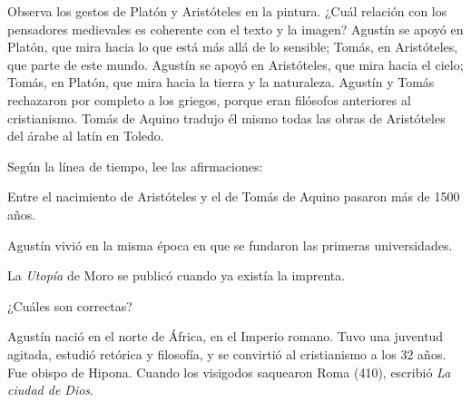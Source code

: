 \documentclass[carta,doscolumnas,compacta]{../plantilla/evaluacion}
\begin{document}
\begin{preguntas}
\begin{pregunta}[A]
Observa los gestos de Platón y Aristóteles en la pintura. ¿Cuál relación con los pensadores
medievales es coherente con el texto y la imagen?
\opcioneslargas
  {Agustín se apoyó en Platón, que mira hacia lo que está más allá de lo sensible; Tomás, en Aristóteles, que parte de este mundo.}
  {Agustín se apoyó en Aristóteles, que mira hacia el cielo; Tomás, en Platón, que mira hacia la tierra y la naturaleza.}
  {Agustín y Tomás rechazaron por completo a los griegos, porque eran filósofos anteriores al cristianismo.}
  {Tomás de Aquino tradujo él mismo todas las obras de Aristóteles del árabe al latín en Toledo.}
\end{pregunta}

\begin{pregunta}[C]
Según la línea de tiempo, lee las afirmaciones:
\begin{afirmaciones}
\item Entre el nacimiento de Aristóteles y el de Tomás de Aquino pasaron más de 1500 años.
\item Agustín vivió en la misma época en que se fundaron las primeras universidades.
\item La \emph{Utopía} de Moro se publicó cuando ya existía la imprenta.
\end{afirmaciones}
¿Cuáles son correctas?
\end{pregunta}

\begin{contexto}
%
{\small Agustín nació en el norte de África, en el Imperio romano. Tuvo una juventud agitada,
estudió retórica y filosofía, y se convirtió al cristianismo a los 32 años. Fue obispo de Hipona.
Cuando los visigodos saquearon Roma (410), escribió \emph{La ciudad de Dios}.}
\end{contexto}


\end{preguntas}
\end{document}
